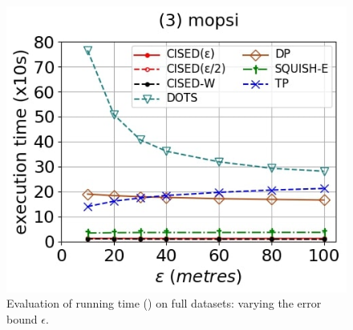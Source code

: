{\begin{figure}[tb!]
	\includegraphics[scale=0.250]{Figures/Exp-SED-time-epsilon-mopsi.jpg}	
	\vspace{-2ex}
	\caption{\small Evaluation of running time (\sed) on full datasets: varying the error bound $\epsilon$.}\label{fig:time-epsilon-sed}
	\vspace{-2ex}
\end{figure}

}
